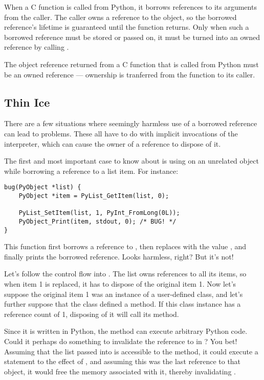 When a C function is called from Python, it borrows references to its
arguments from the caller.  The caller owns a reference to the object,
so the borrowed reference's lifetime is guaranteed until the function
returns.  Only when such a borrowed reference must be stored or passed
on, it must be turned into an owned reference by calling
.

The object reference returned from a C function that is called from
Python must be an owned reference --- ownership is tranferred from the
function to its caller.


\subsection{Thin Ice
            \label{thinIce}}

There are a few situations where seemingly harmless use of a borrowed
reference can lead to problems.  These all have to do with implicit
invocations of the interpreter, which can cause the owner of a
reference to dispose of it.

The first and most important case to know about is using
 on an unrelated object while borrowing a
reference to a list item.  For instance:

\begin{verbatim}
bug(PyObject *list) {
    PyObject *item = PyList_GetItem(list, 0);

    PyList_SetItem(list, 1, PyInt_FromLong(0L));
    PyObject_Print(item, stdout, 0); /* BUG! */
}
\end{verbatim}

This function first borrows a reference to , then
replaces  with the value , and finally prints
the borrowed reference.  Looks harmless, right?  But it's not!

Let's follow the control flow into .  The list
owns references to all its items, so when item 1 is replaced, it has
to dispose of the original item 1.  Now let's suppose the original
item 1 was an instance of a user-defined class, and let's further
suppose that the class defined a  method.  If this
class instance has a reference count of 1, disposing of it will call
its  method.

Since it is written in Python, the  method can execute
arbitrary Python code.  Could it perhaps do something to invalidate
the reference to  in ?  You bet!  Assuming
that the list passed into  is accessible to the
 method, it could execute a statement to the effect of
, and assuming this was the last reference to that
object, it would free the memory associated with it, thereby
invalidating .

